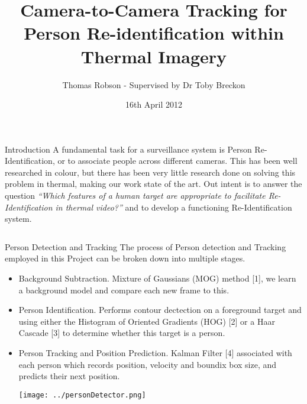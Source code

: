 \documentclass[final]{beamer}
\title[Thermal Re-ID]{Camera-to-Camera Tracking for Person Re-identification within Thermal Imagery}
\author[G Ingram]{Thomas Robson - Supervised by Dr Toby Breckon}
\institute[Durham]{School of Engineering and Computing Sciences, Durham University}
\date{16th April 2012}
\begin{document}
  \begin{frame}{} 
	
	 \begin{block}{Introduction}
  \justify
          A fundamental task for a surveillance system is Person Re-Identification, or to associate people across different cameras. This has been well researched in colour, but there has been very little research done on solving this problem in thermal, making our work state of the art. 
\justify
Out intent is to answer the question {\textit{``Which features of a human target are appropriate to facilitate Re-Identification in thermal video?''}} and to develop a functioning Re-Identification system.
        \end{block}
        
    \begin{columns}[t]
      \begin{column}{.49\linewidth}
      
     
        
        \begin{block}{Person Detection and Tracking}
        	The process of Person detection and Tracking employed in this Project can be broken down into multiple stages. 
        	\begin{itemize}
        	\item Background Subtraction. Mixture of Gaussians (MOG) method [1], we learn a background model and compare each new frame to this. 

        	\item Person Identification. Performs contour dectection on a foreground target and using either the Histogram of Oriented Gradients (HOG) [2] or a Haar Cascade [3] to determine whether this target is a person.
        	
        	\item Person Tracking and Position Prediction. Kalman Filter [4] associated with each person which records position, velocity and boundix box size, and predicts their next position. 
        	
        \texttt{[image: ../personDetector.png]}  
          \end{itemize}
        \end{block}




\end{column}
\end{columns}
\end{frame}
\end{document}
